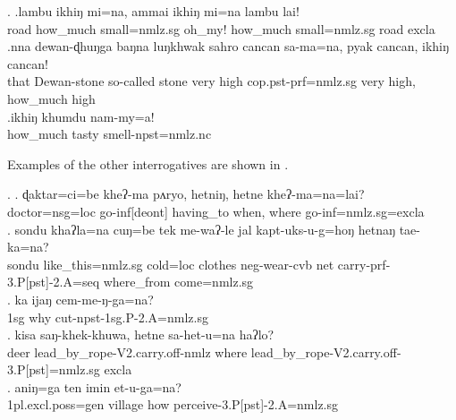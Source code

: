 \ex. \ag.lambu ikhiŋ   mi=na, ammai  ikhiŋ   mi=na  lambu lai!\\
road how\_much small{\sc =nmlz.sg} oh\_my! how\_much small{\sc =nmlz.sg} road {\sc excla}\\
 
\bg.nna  dewan-ɖhuŋga baŋna    luŋkhwak sahro cancan sa-ma=na,                pyak cancan, ikhiŋ   cancan!\\
that Dewan-stone so-called stone very high {\sc cop.pst-prf=nmlz.sg} very high, how\_much high\\
\bg.ikhiŋ khumdu nam-my=a!\\
how\_much  tasty smell{\sc [3sg]-npst=nmlz.nc}\\

 Examples of the other interrogatives are shown in \Next.

 \ex. \ag. ɖaktar=ci=be       kheʔ-ma           pʌryo, hetniŋ,  hetne  kheʔ-ma=na=lai?\\
 doctor{\sc =nsg=loc} go{\sc -inf[deont]} having\_to when, where go{\sc -inf=nmlz.sg=excla}\\
  
 \bg. sondu  khaʔla=na cuŋ=be    tek   me-waʔ-le jal kapt-uks-u-g=hoŋ hetnaŋ    tae-ka=na?\\
 sondu like\_this{\sc =nmlz.sg} cold{\sc =loc} clothes {\sc neg-}wear{\sc -cvb} net carry{\sc -prf-3.P[pst]-2.A=seq} where\_from come{=nmlz.sg}\\
  
 \bg. ka  ijaŋ cem-me-ŋ-ga=na?\\
{\sc 1sg} why cut{\sc -npst-1sg.P-2.A=nmlz.sg}\\
 
\bg. kisa saŋ-khek-khuwa,   hetne  sa-het-u=na          haʔlo?\\
deer lead\_by\_rope{\sc -V2.carry.off-nmlz} where lead\_by\_rope{\sc -V2.carry.off-3.P[pst]=nmlz.sg}  {\sc excla}\\
 
\bg.	aniŋ=ga ten imin et-u-ga=na?\\
			{\sc 1pl.excl.poss=gen} village how perceive{\sc -3.P[pst]-2.A=nmlz.sg}\\


